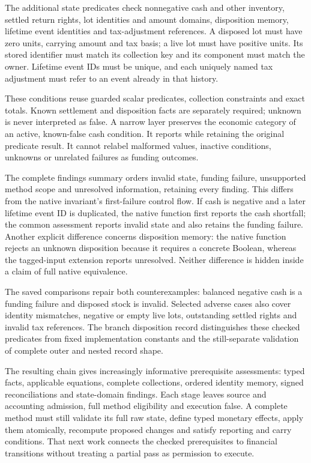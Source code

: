 The additional state predicates check nonnegative cash and other inventory,
settled return rights, lot identities and amount domains, disposition memory,
lifetime event identities and tax-adjustment references. A disposed lot must
have zero units, carrying amount and tax basis; a live lot must have positive
units. Its stored identifier must match its collection key and its component
must match the owner. Lifetime event IDs must be unique, and each uniquely named
tax adjustment must refer to an event already in that history.

These conditions reuse guarded scalar predicates, collection constraints and
exact totals. Known settlement and disposition facts are separately required;
unknown is never interpreted as false. A narrow
 layer preserves the economic category of an active,
known-false cash condition. It reports  while retaining the
original predicate result. It cannot relabel malformed values, inactive
conditions, unknowns or unrelated failures as funding outcomes.

The complete findings summary orders invalid state, funding failure, unsupported
method scope and unresolved information, retaining every finding. This differs
from the native invariant's first-failure control flow. If cash is negative and
a later lifetime event ID is duplicated, the native function first reports the
cash shortfall; the common assessment reports invalid state and also retains
the funding failure. Another explicit difference concerns disposition memory:
the native function rejects an unknown disposition because it requires a
concrete Boolean, whereas the tagged-input extension reports unresolved. Neither
difference is hidden inside a claim of full native equivalence.

The saved comparisons repair both counterexamples: balanced negative cash is a
funding failure and disposed stock is invalid. Selected adverse cases also cover
identity mismatches, negative or empty live lots, outstanding settled rights and
invalid tax references. The branch disposition record distinguishes these
checked predicates from fixed implementation constants and the still-separate
validation of complete outer and nested record shape.

The resulting chain gives increasingly informative prerequisite assessments:
typed facts, applicable equations, complete collections, ordered identity memory,
signed reconciliations and state-domain findings. Each stage leaves source and
accounting admission, full method eligibility and execution false. A complete
method must still validate its full raw state, define typed monetary effects,
apply them atomically, recompute proposed changes and satisfy reporting and
carry conditions. That next work connects the checked prerequisites to financial
transitions without treating a partial pass as permission to execute.
